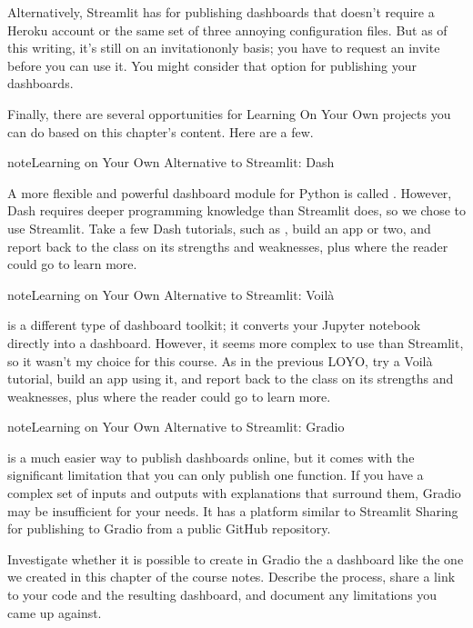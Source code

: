 \documentclass[letterpaper,10pt,english]{jupyterBook}
\begin{document}
\sphinxAtStartPar
Alternatively, Streamlit has  for publishing dashboards that doesn’t require a Heroku account or the same set of three annoying configuration files.  But as of this writing, it’s still on an invitation\sphinxhyphen{}only basis; you have to request an invite before you can use it.  You might consider that option for publishing your dashboards.

\sphinxAtStartPar
Finally, there are several opportunities for Learning On Your Own projects you can do based on this chapter’s content.  Here are a few.

\begin{sphinxadmonition}{note}{Learning on Your Own \sphinxhyphen{} Alternative to Streamlit: Dash}

\sphinxAtStartPar
A more flexible and powerful dashboard module for Python is called .  However, Dash requires deeper programming knowledge than Streamlit does, so we chose to use Streamlit.  Take a few Dash tutorials, such as , build an app or two, and report back to the class on its strengths and weaknesses, plus where the reader could go to learn more.
\end{sphinxadmonition}

\begin{sphinxadmonition}{note}{Learning on Your Own \sphinxhyphen{} Alternative to Streamlit: Voilà}

\sphinxAtStartPar
{} is a different type of dashboard toolkit; it converts your Jupyter notebook directly into a dashboard.  However, it seems more complex to use than Streamlit, so it wasn’t my choice for this course.  As in the previous LOYO, try a Voilà tutorial, build an app using it, and report back to the class on its strengths and weaknesses, plus where the reader could go to learn more.
\end{sphinxadmonition}

\begin{sphinxadmonition}{note}{Learning on Your Own \sphinxhyphen{} Alternative to Streamlit: Gradio}

\sphinxAtStartPar
{} is a much easier way to publish dashboards online, but it comes with the significant limitation that you can only publish one function.  If you have a complex set of inputs and outputs with explanations that surround them, Gradio may be insufficient for your needs.  It has a platform similar to Streamlit Sharing for publishing to Gradio from a public GitHub repository.

\sphinxAtStartPar
Investigate whether it is possible to create in Gradio the a dashboard like the one we created in this chapter of the course notes.  Describe the process, share a link to your code and the resulting dashboard, and document any limitations you came up against.
\end{sphinxadmonition}
\end{document}
